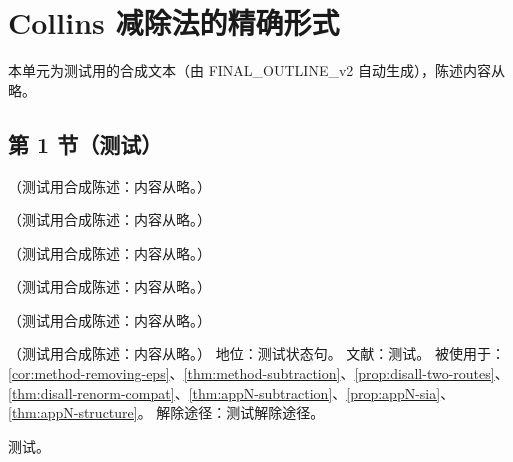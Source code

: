 \chapter{Collins 减除法的精确形式}\label{app:appN}
本单元为测试用的合成文本（由 FINAL\_OUTLINE\_v2 自动生成），陈述内容从略。

\section{第 1 节（测试）}\label{sec:appN-setting}

\begin{definition}\label{def:appN-integrand}
（测试用合成陈述：内容从略。）
\end{definition}

\begin{lemma}[幂次压低类的基本性质]\label{lem:appN-suppressed-sets}
（测试用合成陈述：内容从略。）
\end{lemma}

\begin{remark}[区域集合的两条约定]\label{rem:appN-hard-soft-lines}
（测试用合成陈述：内容从略。）
\end{remark}

\begin{lemma}[邻域指数的可行选择]\label{lem:appN-beta}
（测试用合成陈述：内容从略。）
\end{lemma}

\begin{example}[两圈平面顶点的九个领头区域]\label{ex:appN-vertex-regions}
（测试用合成陈述：内容从略。）
\end{example}

\begin{assumption}[(GA1) 围道 \tagA]\label{asm:appN-contour}
（测试用合成陈述：内容从略。）
地位：测试状态句。
文献：测试。
被使用于：\cref{cor:method-removing-eps}、\cref{thm:method-subtraction}、\cref{prop:disall-two-routes}、\cref{thm:disall-renorm-compat}、\cref{thm:appN-subtraction}、\cref{prop:appN-sia}、\cref{thm:appN-structure}。
解除途径：测试解除途径。
\end{assumption}
\begin{proofsketch}测试。\end{proofsketch}

